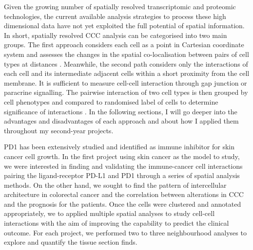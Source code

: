 Given the growing number of spatially resolved transcriptomic and proteomic technologies, the current available analysis strategies to process these high dimensional data have not yet exploited the full potential of spatial information. In short, spatially resolved CCC analysis can be categorised into two main groups. The first approach considers each cell as a point in Cartesian coordinate system and assesses the changes in the spatial co-localisation between pairs of cell types at distances \cite{arnol2019modeling,schurch2020coordinated}. Meanwhile, the second path considers only the interactions of each cell and its intermediate adjacent cells within a short proximity from the cell membrane. It is sufficient to measure cell-cell interaction through gap junction or paracrine signalling. The pairwise interaction of two cell types is then grouped by cell phenotypes and compared to randomised label of cells to determine significance of interactions  \cite{schapiro2017histocat}.  In the following sections, I will go deeper into the advantages and disadvantages of each approach and about how I applied them throughout my second-year projects.    

PD1 has been extensively studied and identified as immune inhibitor for skin cancer cell growth\cite{ishida1992induced,  tsai2014pd}. In the first project using skin cancer as the model to study, we were interested in finding and validating the immune-cancer cell interactions pairing the ligand-receptor PD-L1 and PD1 through a series of spatial analysis methods. On the other hand, we sought to find the pattern of intercellular architecture in colorectal cancer and the correlation between alterations in CCC and the prognosis for the patients. Once the cells were clustered and annotated appropriately, we to applied multiple spatial analyses to study cell-cell interactions with the aim of improving the capability to predict the clinical outcome. For each project, we performed two to three neighbourhood analyses to explore and quantify the tissue section finds.  



